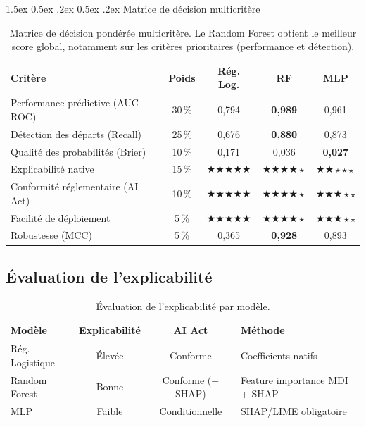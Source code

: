 \documentclass[12pt,a4paper]{article}
\makeatletter
\renewcommand\paragraph{\@startsection{paragraph}{4}{\z@}%
  {1.5ex \@plus 0.5ex \@minus .2ex}%
  {0.5ex \@plus .2ex}%
  {\normalfont\normalsize\bfseries}}
\makeatother
\begin{document}
\paragraph{Matrice de décision multicritère}

\begin{table}[ht]
\centering
\small
\begin{tabularx}{\textwidth}{Xcccc}
\toprule
\textbf{Critère} & \textbf{Poids} & \textbf{Rég. Log.} & \textbf{RF} & \textbf{MLP} \\
\midrule
Performance prédictive (AUC-ROC) & 30\,\% & 0{,}794 & \textbf{0{,}989} & 0{,}961 \\
Détection des départs (Recall) & 25\,\% & 0{,}676 & \textbf{0{,}880} & 0{,}873 \\
Qualité des probabilités (Brier) & 10\,\% & 0{,}171 & 0{,}036 & \textbf{0{,}027} \\
Explicabilité native & 15\,\% & $\bigstar\bigstar\bigstar\bigstar\bigstar$ & $\bigstar\bigstar\bigstar\bigstar\star$ & $\bigstar\bigstar\star\star\star$ \\
Conformité réglementaire (AI Act) & 10\,\% & $\bigstar\bigstar\bigstar\bigstar\bigstar$ & $\bigstar\bigstar\bigstar\bigstar\star$ & $\bigstar\bigstar\bigstar\star\star$ \\
Facilité de déploiement & 5\,\% & $\bigstar\bigstar\bigstar\bigstar\bigstar$ & $\bigstar\bigstar\bigstar\bigstar\star$ & $\bigstar\bigstar\bigstar\star\star$ \\
Robustesse (MCC) & 5\,\% & 0{,}365 & \textbf{0{,}928} & 0{,}893 \\
\bottomrule
\end{tabularx}
\caption{Matrice de décision pondérée multicritère. Le Random Forest obtient le meilleur score global, notamment sur les critères prioritaires (performance et détection).}
\end{table}

\subsection{Évaluation de l'explicabilité}

\begin{table}[ht]
\centering
\begin{tabularx}{\textwidth}{lccX}
\toprule
\textbf{Modèle} & \textbf{Explicabilité} & \textbf{AI Act} & \textbf{Méthode} \\
\midrule
Rég. Logistique & Élevée & Conforme & Coefficients natifs \\
Random Forest & Bonne & Conforme (+ SHAP) & Feature importance MDI + SHAP \\
MLP & Faible & Conditionnelle & SHAP/LIME obligatoire \\
\bottomrule
\end{tabularx}
\caption{Évaluation de l'explicabilité par modèle.}
\end{table}
\end{document}
